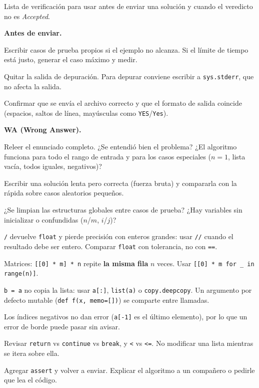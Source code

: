 Lista de verificación para usar antes de enviar una solución y cuando el veredicto no es \textit{Accepted}.

\textbf{Antes de enviar.}
\begin{props}
  \item Escribir casos de prueba propios si el ejemplo no alcanza. Si el límite de tiempo está justo, generar el caso máximo y medir.
  \item Quitar la salida de depuración. Para depurar conviene escribir a \texttt{sys.stderr}, que no afecta la salida.
  \item Confirmar que se envía el archivo correcto y que el formato de salida coincide (espacios, saltos de línea, mayúsculas como \texttt{YES}/\texttt{Yes}).
\end{props}

\textbf{WA (Wrong Answer).}
\begin{props}
  \item Releer el enunciado completo. ¿Se entendió bien el problema? ¿El algoritmo funciona para todo el rango de entrada y para los casos especiales (\(n = 1\), lista vacía, todos iguales, negativos)?
  \item Escribir una solución lenta pero correcta (fuerza bruta) y compararla con la rápida sobre casos aleatorios pequeños.
  \item ¿Se limpian las estructuras globales entre casos de prueba? ¿Hay variables sin inicializar o confundidas (\(n\)/\(m\), \(i\)/\(j\))?
  \item \texttt{/} devuelve \texttt{float} y pierde precisión con enteros grandes: usar \texttt{//} cuando el resultado debe ser entero. Comparar \texttt{float} con tolerancia, no con \texttt{==}.
  \item Matrices: \texttt{[[0] * m] * n} repite \textbf{la misma fila} \(n\) veces. Usar \texttt{[[0] * m for \_ in range(n)]}.
  \item \texttt{b = a} no copia la lista: usar \texttt{a[:]}, \texttt{list(a)} o \texttt{copy.deepcopy}. Un argumento por defecto mutable (\texttt{def f(x, memo=[])}) se comparte entre llamadas.
  \item Los índices negativos no dan error (\texttt{a[-1]} es el último elemento), por lo que un error de borde puede pasar sin avisar.
  \item Revisar \texttt{return} vs \texttt{continue} vs \texttt{break}, y \texttt{<} vs \texttt{<=}. No modificar una lista mientras se itera sobre ella.
  \item Agregar \texttt{assert} y volver a enviar. Explicar el algoritmo a un compañero o pedirle que lea el código.
\end{props}

